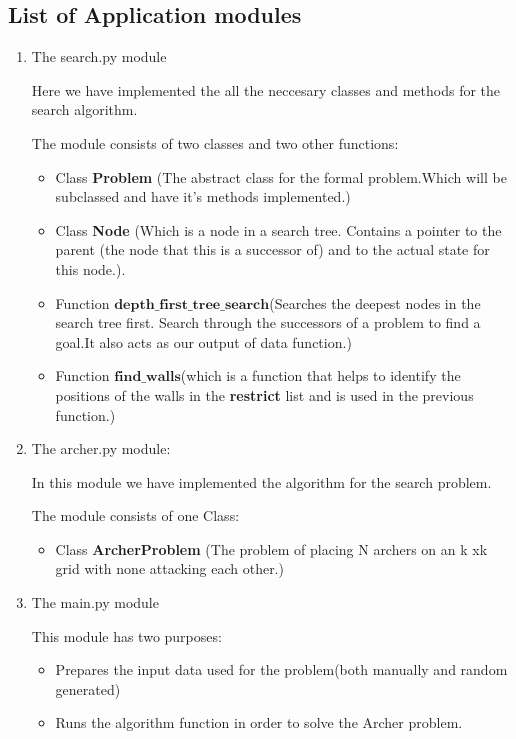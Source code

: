 \documentclass{article}
\begin{document}
\subsection{List of Application modules}
\begin{enumerate}
  \item The search.py module
  \par Here we have implemented the all the neccesary classes and methods for the search algorithm.
  \par The module consists of two classes and two other functions:
  \begin{itemize}
  \item Class \textbf{Problem} (The abstract class for the  formal problem.Which will be subclassed and have it's methods implemented.)
  \item Class \textbf{Node} (Which is a node in a search tree. Contains a pointer to the parent (the node that this is a successor of) and to the actual state for this node.).
  \item Function $\textbf{depth\_first\_tree\_search}$(Searches the deepest nodes in the search tree first.
        Search through the successors of a problem to find a goal.It also acts as our output of data function.)
  \item Function $\textbf{find\_walls}$(which is a function that helps to identify the positions of the walls in the \textbf{restrict} list and is used in the previous function.)
\end{itemize}
  \item The archer.py module:
  \par In this module we have implemented the algorithm for the search problem.
  \par The module consists of one Class:
  \begin{itemize}
  \item Class \textbf{ArcherProblem} (The problem of placing N archers on an k xk grid with none attacking
    each other.)
  
\end{itemize}
  \item The main.py module
  \par This module has two purposes:
  \begin{itemize}
  \item Prepares the input data used for the problem(both manually and random generated)
  \item Runs the algorithm function in order to solve the Archer problem. 
\end{itemize}
\end{enumerate}
\end{document}
